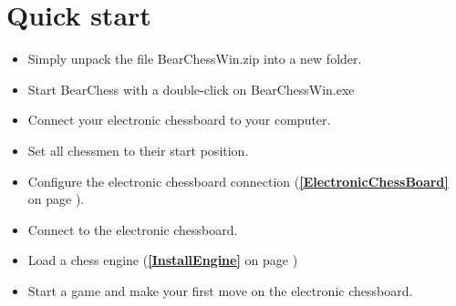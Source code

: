 \documentclass[11pt,a4paper]{article}
\begin{document}
\section{Quick start}
\begin{itemize}
	\item Simply unpack the file BearChessWin.zip into a new folder.
	\item Start BearChess with a double-click on BearChessWin.exe
	\item Connect your electronic chessboard to your computer.
	\item Set all chessmen to their start position.
	\item Configure the electronic chessboard connection (\textbf{\ref{ElectronicChessBoard}  } on page \pageref{ElectronicChessBoard}).
	\item Connect to the electronic chessboard.
	\item Load a chess engine (\textbf{\ref{InstallEngine}  } on page \pageref{InstallEngine})
	\item Start a game and make your first move on the electronic chessboard.
\end{itemize}
\end{document}
